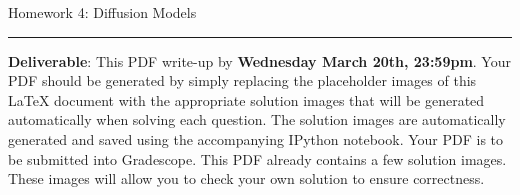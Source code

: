 \documentclass{article}
\newcommand{\ruleskip}{\bigskip\hrule\bigskip}
\begin{document}
\pagestyle{myheadings} 

{\huge
\noindent Homework 4: Diffusion Models}
\ruleskip

{\bf Deliverable}: This PDF write-up by {\bf Wednesday March 20th, 23:59pm}.  Your PDF should be generated by simply replacing the placeholder images of this LaTeX document with the appropriate solution images that will be generated automatically when solving each question. The solution images are automatically generated and saved using the accompanying IPython notebook. Your PDF is to be submitted into Gradescope. This PDF already contains a few solution images.  These images will allow you to check your own solution to ensure correctness.


\vspace{.2in}

\end{document}
